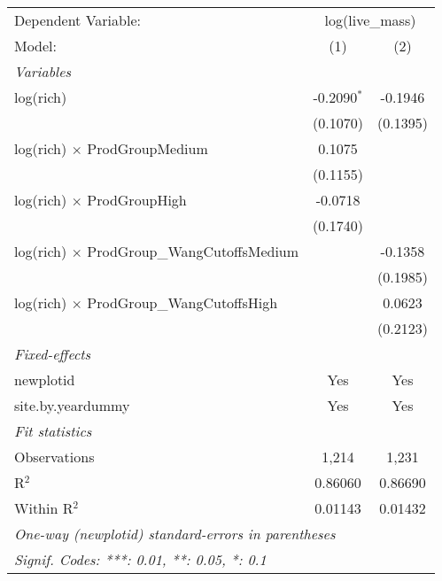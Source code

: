 \begin{tabular}{lcc}
\tabularnewline\midrule\midrule
Dependent Variable:&\multicolumn{2}{c}{log(live\_mass)}\\
Model:&(1) & (2)\\
\midrule \emph{Variables}&   &  \\
log(rich)&-0.2090$^{*}$ & -0.1946\\
  &(0.1070) & (0.1395)\\
log(rich) $\times $ ProdGroupMedium&0.1075 &   \\
  &(0.1155) &   \\
log(rich) $\times $ ProdGroupHigh&-0.0718 &   \\
  &(0.1740) &   \\
log(rich) $\times $ ProdGroup\_WangCutoffsMedium&   & -0.1358\\
  &   & (0.1985)\\
log(rich) $\times $ ProdGroup\_WangCutoffsHigh&   & 0.0623\\
  &   & (0.2123)\\
\midrule \emph{Fixed-effects}&   &  \\
newplotid & Yes & Yes\\
site.by.yeardummy & Yes & Yes\\
\midrule \emph{Fit statistics}&  & \\
Observations & 1,214&1,231\\
R$^2$ & 0.86060&0.86690\\
Within R$^2$ & 0.01143&0.01432\\
\midrule\midrule\multicolumn{3}{l}{\emph{One-way (newplotid) standard-errors in parentheses}}\\
\multicolumn{3}{l}{\emph{Signif. Codes: ***: 0.01, **: 0.05, *: 0.1}}\\
\end{tabular}



